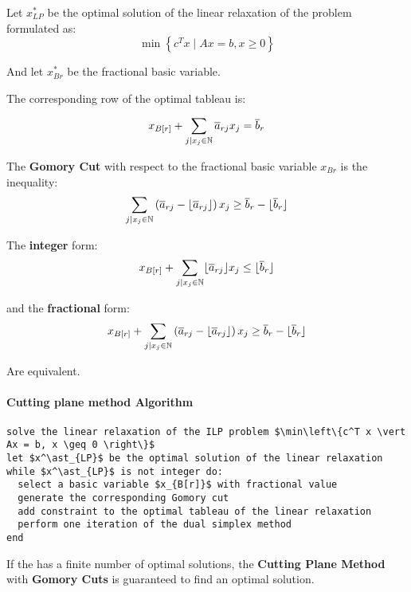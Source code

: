 \documentclass[english]{article}
\begin{document}
Let \(x^\ast_{LP}\) be the optimal solution of the linear relaxation of the \ILP problem formulated as:
\[ \min \left\{ c^T x \mid Ax = b, x \geq 0 \right\} \]

And let \(x^\ast_{B{r}}\) be the fractional basic variable.

The corresponding row of the optimal tableau is:

\[ x_{B[r]} + \displaystyle \sum_{j \vert x_j \in \mathbb{N}} \overline{a}_{rj} x_j = \overline{b}_r \]

\begin{definition}
  The \textbf{Gomory Cut} with respect to the fractional basic variable \(x_{B{r}}\) is the inequality:
  \[ \displaystyle \sum_{j \vert x_j \in \mathbb{N}} \left( \overline{a}_{rj} - \lfloor \overline{a}_{rj} \rfloor \right) x_j \geq \overline{b}_r - \lfloor \overline{b}_r \rfloor \]
\end{definition}

\begin{property}
  The \textbf{integer} form:
  \[ \displaystyle x_{B[r]} + \sum_{j \vert x_j \in \mathbb{N}} \lfloor\overline{a}_{rj}\rfloor x_j \leq \lfloor\overline{b}_r\rfloor \]

  and the \textbf{fractional} form:
  \[ \displaystyle x_{B[r]} + \sum_{j \vert x_j \in \mathbb{N}} \left( \overline{a}_{rj} - \lfloor \overline{a}_{rj} \rfloor \right) x_j \geq \overline{b}_r - \lfloor \overline{b}_r \rfloor \]

  Are equivalent.
\end{property}

\paragraph{Cutting plane method Algorithm}

\begin{lstlisting}[label={lst:cutting-plane-method-gomory}, caption={Cutting plane method with fractional Gomory Cuts}]
solve the linear relaxation of the ILP problem $\min\left\{c^T x \vert Ax = b, x \geq 0 \right\}$
let $x^\ast_{LP}$ be the optimal solution of the linear relaxation
while $x^\ast_{LP}$ is not integer do:
  select a basic variable $x_{B[r]}$ with fractional value
  generate the corresponding Gomory cut
  add constraint to the optimal tableau of the linear relaxation
  perform one iteration of the dual simplex method
end
\end{lstlisting}

\begin{theorem}
  If the \ILP has a finite number of optimal solutions, the \textbf{Cutting Plane Method} with \textbf{Gomory Cuts} is guaranteed to find an optimal solution.
\end{theorem}
\end{document}
